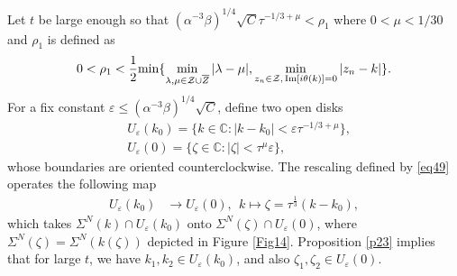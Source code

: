\documentclass[11pt]{article}
\numberwithin{equation}{section}
\begin{document}
Let  $t$  be  large enough so that $\left(\alpha^{-3}\beta\right)^{1/4} \sqrt{C} \tau^{-1/3+\mu}<\rho_1$ where $0<\mu<1/30$ and  $\rho_1$ is defined as
\begin{equation}\label{eq48}
 0<\rho_1 <  \frac{1}{2} {\rm min}  \{   \operatorname*{min}\limits_{ \lambda,\mu\in  \mathcal{Z}\cup\overline{Z} }  |\lambda-\mu|,     \operatorname*{min}\limits_{z_n\in \mathcal{Z}, \, { \mathrm{Im}[i\theta(k)] =0 }}  | z_n-k|  \}.
 \end{equation}
For a fix constant  $\varepsilon \leqslant \left(\alpha^{-3}\beta\right)^{1/4} \sqrt{C}$, define  two open disks
  \begin{align}
&   U_{\varepsilon}(k_0) = \{k \in \mathbb{C}: |k-k_0|< \varepsilon \tau^{-1/3+\mu}\},\nonumber\\
&  U_{\varepsilon }(0) = \{\zeta \in \mathbb{C}: |\zeta|< \tau^{\mu}\varepsilon \},\nonumber
\end{align}
whose   boundaries are  oriented counterclockwise.
The rescaling  defined by \eqref{eq49}
operates the following  map
\begin{align}
     U_{\varepsilon}(k_0) &\to U_{\varepsilon }(0), \ \
     k \mapsto \zeta= \tau ^{\frac{1}{3}}(k-k_0),
\end{align}
which takes $\Sigma^{N}(k) \cap U_{\varepsilon}(k_0)$ onto $\Sigma^{N}(\zeta)\cap U_{\varepsilon}(0)$, where $\Sigma^{N}(\zeta)=\Sigma^{N}(k(\zeta))$ depicted in Figure \ref{Fig14}.
Proposition \ref{p23}  implies that  for  large $t$,   we have   $k_1, k_2 \in U_{\varepsilon} (k_0)$,
and also  $\zeta_1, \zeta_2 \in U_{\varepsilon} (0)$.
\end{document}
